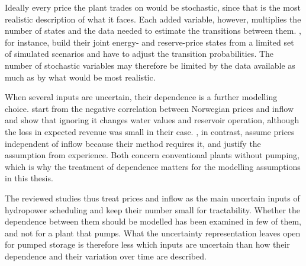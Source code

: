 Ideally every price the plant trades on would be stochastic, since that is
the most realistic description of what it faces. Each added variable, however,
multiplies the number of states and the data needed to estimate the
transitions between them. \citet{helseth2016}, for instance, build their
joint energy- and reserve-price states from a limited set of simulated
scenarios and have to adjust the transition probabilities. The number of
stochastic variables may therefore be limited by the data available as much
as by what would be most realistic.

When several inputs are uncertain, their dependence is a further modelling
choice. \citet{kleiven2023} start from the negative correlation between
Norwegian prices and inflow and show that ignoring it changes water values and
reservoir operation, although the loss in expected revenue was small in their
case. \citet{helseth2016}, in contrast, assume prices independent of inflow
because their method requires it, and justify the assumption from experience.
Both concern conventional plants without pumping, which is why the treatment
of dependence matters for the modelling assumptions in this thesis.

The reviewed studies thus treat prices and inflow as the main uncertain inputs
of hydropower scheduling and keep their number small for tractability.
Whether the dependence between them should be modelled has been examined in
few of them, and not for a plant that pumps. What the uncertainty representation
leaves open for pumped storage is therefore less which inputs are uncertain
than how their dependence and their variation over time are described.
